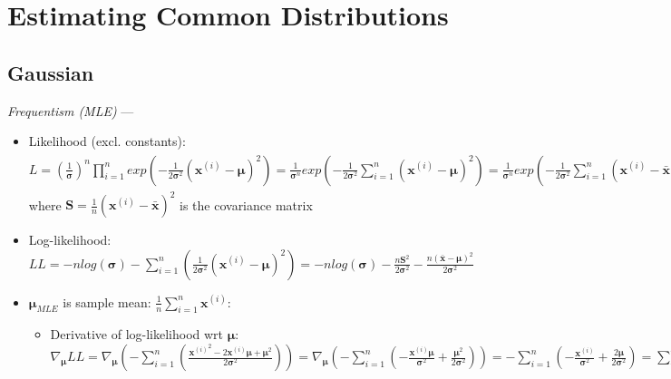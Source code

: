 \section{Estimating Common Distributions}
\subsection*{Gaussian}
\emph{Frequentism (MLE)} --- 
\begin{itemize}
    \item Likelihood (excl. constants): $L = (\frac{1}{\boldsymbol{\sigma}})^n \prod_{i=1}^n exp( -\frac{1}{2\boldsymbol{\sigma}^2} (\boldsymbol{x}^{(i)} - \boldsymbol{\mu} )^2) = \frac{1}{\boldsymbol{\sigma}^n} exp( -\frac{1}{2\boldsymbol{\sigma}^2} \sum_{i=1}^n (\boldsymbol{x}^{(i)} - \boldsymbol{\mu} )^2) = \frac{1}{\boldsymbol{\sigma}^n} exp( -\frac{1}{2\boldsymbol{\sigma}^2} \sum_{i=1}^n (\boldsymbol{x}^{(i)} - \bar{\boldsymbol{x}} + \bar{\boldsymbol{x}} - \boldsymbol{\mu} )^2) = \frac{1}{\boldsymbol{\sigma}^n} exp( -\frac{\sum_{i=1}^n (\boldsymbol{x}^{(i)} - \bar{\boldsymbol{x}})^2}{2\boldsymbol{\sigma}^2}) exp(- \frac{n (\bar{\boldsymbol{x}} - \boldsymbol{\mu})^2}{2\boldsymbol{\sigma}^2}) = \frac{1}{\boldsymbol{\sigma}^n} exp( -\frac{n \boldsymbol{S}^2}{2\boldsymbol{\sigma}^2}) exp(- \frac{n (\bar{\boldsymbol{x}} - \boldsymbol{\mu})^2}{2\boldsymbol{\sigma}^2})$ where $\boldsymbol{S} = \frac{1}{n} (\boldsymbol{x}^{(i)} - \bar{\boldsymbol{x}})^2$ is the covariance matrix
    \item Log-likelihood: $LL = -n log(\boldsymbol{\sigma}) - \sum_{i=1}^n (\frac{1}{2\boldsymbol{\sigma}^2} (\boldsymbol{x}^{(i)} - \boldsymbol{\mu} )^2) = -n log(\boldsymbol{\sigma})  -\frac{n \boldsymbol{S}^2}{2\boldsymbol{\sigma}^2} - \frac{n (\bar{\boldsymbol{x}} - \boldsymbol{\mu})^2}{2\boldsymbol{\sigma}^2}$
    \item $\boldsymbol{\mu}_{MLE}$ is sample mean: $ \frac{1}{n}\sum_{i=1}^n \boldsymbol{x}^{(i)}$:
    \begin{itemize}
        \item Derivative of log-likelihood wrt $\boldsymbol{\mu}$: $\nabla_{\boldsymbol{\mu}} LL = \nabla_{\boldsymbol{\mu}} (- \sum_{i=1}^n (\frac{{\boldsymbol{x}^{(i)}}^2 - 2 \boldsymbol{x}^{(i)} \boldsymbol{\mu} + \boldsymbol{\mu}^2}{2\boldsymbol{\sigma}^2})) = \nabla_{\boldsymbol{\mu}} (- \sum_{i=1}^n (-\frac{ \boldsymbol{x}^{(i)} \boldsymbol{\mu}}{\boldsymbol{\sigma}^2} + \frac{ \boldsymbol{\mu}^2}{2\boldsymbol{\sigma}^2} )) = - \sum_{i=1}^n (-\frac{ \boldsymbol{x}^{(i)}}{\boldsymbol{\sigma}^2} + \frac{ 2\boldsymbol{\mu}}{2\boldsymbol{\sigma}^2} ) =  \sum_{i=1}^n (\frac{ \boldsymbol{x}^{(i)} - \boldsymbol{\mu}}{\boldsymbol{\sigma}^2}) = \sum_{i=1}^n \boldsymbol{x}^{(i)} - n\boldsymbol{\mu} = 0 $

\end{itemize}
\end{itemize}
